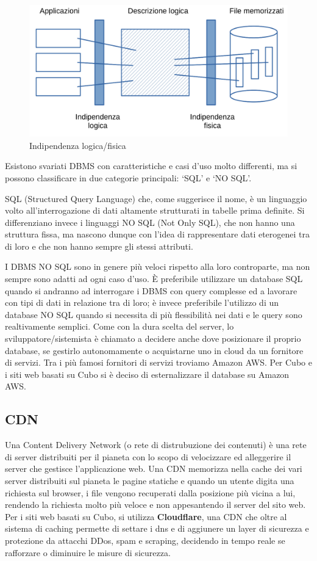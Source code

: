 \documentclass[12pt,a4paper]{article}
\begin{document}
\begin{figure}[H]
    \centering
    \includegraphics[width=.9\linewidth]{indipendenza_logica_fisica.png}
    \caption{Indipendenza logica/fisica}
\end{figure}

Esistono svariati DBMS con caratteristiche e casi d’uso molto differenti, ma si possono classificare in due categorie principali: ‘SQL’ e ‘NO SQL’.

SQL (Structured Query Language) che, come suggerisce il nome, è un linguaggio volto all’interrogazione di dati altamente strutturati in tabelle prima definite.
Si differenziano invece i linguaggi NO SQL (Not Only SQL), che non hanno una struttura fissa, ma nascono dunque con l’idea di rappresentare dati eterogenei tra di loro e che non hanno sempre gli stessi attributi.

I DBMS NO SQL sono in genere più veloci rispetto alla loro controparte, ma non sempre sono adatti ad ogni caso d’uso. È preferibile utilizzare un database SQL quando si andranno ad interrogare i DBMS con query complesse ed a lavorare con tipi di dati in relazione tra di loro; è invece preferibile l’utilizzo di un database NO SQL quando si necessita di più flessibilità nei dati e le query sono realtivamente semplici.
Come con la dura scelta del server, lo sviluppatore/sistemista è chiamato a decidere anche dove posizionare il proprio database, se gestirlo autonomamente o acquistarne uno in cloud da un fornitore di servizi. Tra i più famosi fornitori di servizi troviamo Amazon AWS. Per Cubo e i siti web basati su Cubo si è deciso di esternalizzare il database su Amazon AWS.

\subsection{CDN}
Una Content Delivery Network (o rete di distrubuzione dei contenuti) è una rete di server distribuiti per il pianeta con lo scopo di velocizzare ed alleggerire il server che gestisce l'applicazione web.
Una CDN memorizza nella cache dei vari server distribuiti sul pianeta le pagine statiche e quando un utente digita una richiesta sul browser, i file vengono recuperati dalla posizione più vicina a lui, rendendo la richiesta molto più veloce e non appesantendo il server del sito web.
Per i siti web basati su Cubo, si utilizza \textbf{Cloudflare}, una CDN che oltre al sistema di caching permette di settare i dns e di aggiunere un layer di sicurezza e protezione da attacchi DDos, spam e scraping, decidendo in tempo reale se rafforzare o diminuire le misure di sicurezza.
\end{document}
